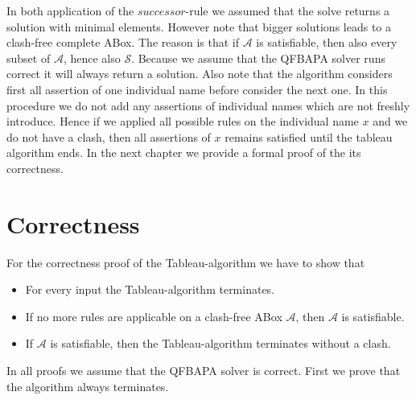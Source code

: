 \documentclass{book}
\theoremstyle{break}
\theoremstyle{definition}
\begin{document}
In both application of the $successor$-rule we assumed that the solve returns a solution with minimal elements. However note that bigger solutions leads to a clash-free complete ABox. The reason is that if $\mathcal{A}$ is satisfiable, then also every subset of $\mathcal{A}$, hence also $\mathcal{S}$. Because we assume that the QFBAPA solver runs correct it will always return a solution. Also note that the algorithm considers first all assertion of one individual name before consider the next one. In this procedure we do not add any assertions of individual names which are not freshly introduce. Hence if we applied all possible rules on the individual name $x$ and we do not have a clash, then all assertions of $x$ remains satisfied until the tableau algorithm ends. In the next chapter we provide a formal proof of the its correctness.
\chapter{Correctness}
For the correctness proof of the Tableau-algorithm we have to show that
\begin{itemize}
\item For every input the Tableau-algorithm terminates.
\item If no more rules are applicable on a clash-free ABox $\mathcal{A}$, then $\mathcal{A}$ is satisfiable.
\item If $\mathcal{A}$ is satisfiable, then the Tableau-algorithm terminates without a clash.
\end{itemize}
In all proofs we assume that the QFBAPA solver is correct. First we prove that the algorithm always terminates.
\end{document}
